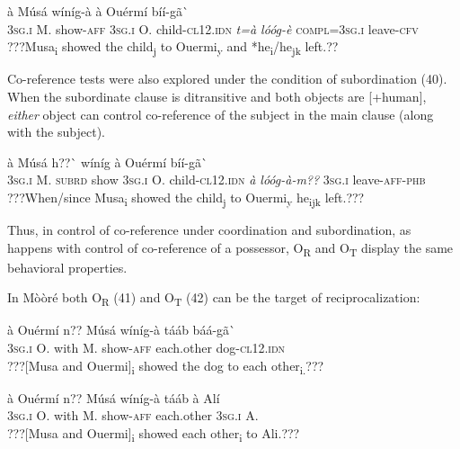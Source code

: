 \documentclass[output=paper]{langsci/langscibook}
\begin{document}
\ea \gll 
à    Músá  wíníg-à  à    Ouérmí  bíí-gã\`{ }        
\\
%
\textsc{3sg.i  }  M.  show-\textsc{aff}  \textsc{3sg.i  }  O.    child-\textsc{cl12.idn}     
\textit{  t=à      lóóg-è}
\textsc{  compl=3sg.i}        leave-\textsc{cfv}
\\\glt
???Musa\textsubscript{i}  showed the child\textsubscript{j} to Ouermi\textsubscript{y} and *he\textsubscript{i}/he\textsubscript{jk} left.??
\z

Co-reference tests were also explored under the condition of subordination (40). When the subordinate clause is ditransitive and both objects are [+human], \textit{either} object can control co-reference of the subject in the main clause (along with the subject).


\ea \gll 
\label{bkm:Ref424332520}à    Músá  h??\`{ }    wíníg  à    Ouérmí      bíí-gã\`{ }    
\\
%
\textsc{3sg.i  }  M.  \textsc{subrd}    show  \textsc{3sg.i  }  O.        child-\textsc{cl12.idn}
\textsc{  }\textit{à     lóóg-à-m??}
  \textsc{3sg.i  }  leave-\textsc{aff-phb}
\\\glt
???When/since Musa\textsubscript{i }showed the child\textsubscript{j} to Ouermi\textsubscript{y} he\textsubscript{ijk} left.???
\z

Thus, in control of co-reference under coordination and subordination, as happens with control of co-reference of a possessor, O\textsubscript{R} and O\textsubscript{T} display the same behavioral properties. 


In Mòòré both O\textsubscript{R} (41) and O\textsubscript{T} (42) can be the target of reciprocalization:


\ea \gll 
\label{bkm:Ref424287194}à    Ouérmí  n??  Músá  wíníg-à  tááb    báá-gã\`{ }
\\
%
\textsc{3sg.i  }  O.    with  M.  show-\textsc{aff}  each.other  dog-\textsc{cl12.idn}
\\\glt
???[Musa and Ouermi]\textsubscript{i} showed the dog to each other\textsubscript{i.}???
\z


\ea \gll 
\label{bkm:Ref424287203}à    Ouérmí  n??  Músá  wíníg-à  tááb    à    Alí
\\
%
\textsc{3sg.i    }O.    with  M.  show-\textsc{aff}  each.other  \textsc{3sg.i  }   A.
\\\glt
???[Musa and Ouermi]\textsubscript{i} showed each other\textsubscript{i} to Ali.???
\z
\end{document}
